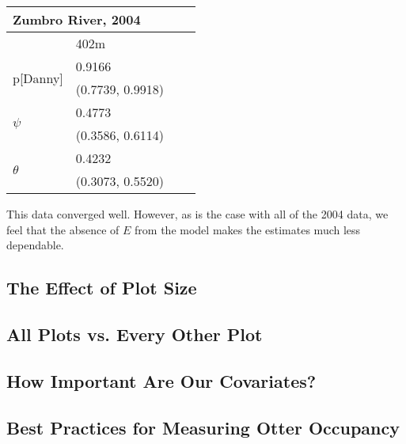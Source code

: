 \documentclass{article}
\begin{document}
    \begin{center}
    \begin{tabular}{|l|l|l|l|}
        \hline
        \multicolumn{2}{|l|}{\textbf{Zumbro River, 2004}} \\
        \hline
            & 402m \\
        \hline
        \multirow{2}{*}{p[Danny]}
            & 0.9166 \\
            & (0.7739, 0.9918) \\
        \hline
        \multirow{2}{*}{\(\psi\)}
            & 0.4773 \\
            & (0.3586, 0.6114) \\
        \hline
        \multirow{2}{*}{\(\theta\)}
            & 0.4232 \\
            & (0.3073, 0.5520) \\
        \hline
    \end{tabular}
    \end{center}

    This data converged well.  However, as is the case with all of the 2004
    data, we feel that the absence of \(E\) from the model makes the estimates
    much less dependable.

    \subsection{The Effect of Plot Size}
    \subsection{All Plots vs. Every Other Plot}
    \subsection{How Important Are Our Covariates?}
    \subsection{Best Practices for Measuring Otter Occupancy}
\end{document}
